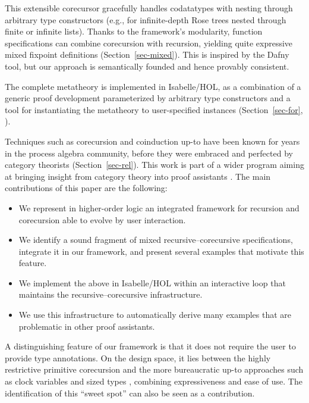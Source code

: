 \documentclass[preprint,draft]
{sigplanconf}
\newcommand{\<}{\langle}
\renewcommand{\>}{\rangle}
\def\S{Section~}
\begin{document}
This extensible corecursor gracefully
handles codatatypes with nesting through arbitrary type constructors (e.g., for
infinite-depth Rose trees nested through finite or infinite lists).
Thanks to the framework's modularity,
function specifications can combine corecursion with recursion, yielding quite expressive mixed fixpoint definitions (\S\ref{sec-mixed}).
This is inspired by the Dafny tool, but our approach is
semantically founded and hence provably consistent.






The complete metatheory is implemented in Isabelle\slash HOL, as a combination of a generic
proof development parameterized by arbitrary type constructors and a tool for instantiating
the metatheory to user-specified instances (\S\ref{sec-for}, \cite{our-formalization}).

Techniques such as corecursion and coinduction up-to have been
known for years in the process algebra community, before they were embraced and
perfected by category theorists (\S\ref{sec-rel}).
This work is part of a wider program aiming at bringing
insight from category theory into proof assistants
\cite{traytel-et-al-2012,blanchette-et-al-2014-impl}. The main contributions of this paper are the following:
\begin{itemize}
\item We represent in higher-order logic an integrated framework for recursion and corecursion
able to evolve by user interaction.





\item We identify a sound fragment of mixed recursive--corecursive
specifications, integrate it in our framework, and present several examples
that motivate this feature.

\item We implement the above in Isabelle/HOL within an interactive loop that maintains the recursive--corecursive infrastructure.

\item We use this infrastructure to automatically derive many examples that are
problematic in other proof assistants.
\end{itemize}

A distinguishing feature of our framework is that it does not require the user
to provide type annotations. On the design space, it lies
between the highly restrictive primitive corecursion and
the more bureaucratic up-to approaches such as clock variables
\cite{mcbride-productive,clouston-et-al-2015}
and sized types \cite{abel-2004}, combining expressiveness and ease of use.
The identification of this ``sweet spot'' can also be seen as a contribution.
\end{document}
